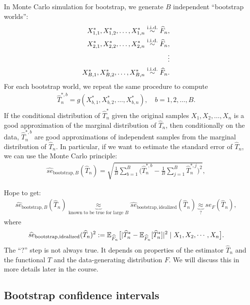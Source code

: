 \documentclass[11pt,letterpaper]{article}
\numberwithin{assumption}{lecture}
\numberwithin{theorem}{lecture}
\numberwithin{proposition}{lecture}
\numberwithin{lemma}{lecture}
\numberwithin{claim}{lecture}
\numberwithin{corollary}{lecture}
\numberwithin{definition}{lecture}
\numberwithin{conjecture}{lecture}
\numberwithin{remark}{lecture}
\numberwithin{example}{lecture}
\numberwithin{equation}{lecture}
\begin{document}
\begin{itemize}
  In Monte Carlo simulation for bootstrap, we generate $B$ independent ``bootstrap worlds'':
  \begin{align*}
    X_{1, 1}^*, X_{1, 2}^*, \ldots, X_{1, n}^* \overset{\mathrm{i.i.d.}}{\sim} \widehat{F}_n,\\
    X_{2, 1}^*, X_{2, 2}^*, \ldots, X_{2, n}^* \overset{\mathrm{i.i.d.}}{\sim} \widehat{F}_n,\\
    \vdots\\
    X_{B, 1}^*, X_{B, 2}^*, \ldots, X_{B, n}^* \overset{\mathrm{i.i.d.}}{\sim} \widehat{F}_n.
  \end{align*}
  For each bootstrap world, we repeat the same procedure to compute
  \begin{align*}
    \widehat{T}_{n}^{*, b} = g (X_{b, 1}^*, X_{b, 2}^*, \ldots, X_{b, n}^*), \quad b = 1, 2, \ldots, B.
  \end{align*}
  If the conditional distribution of $\widehat{T}_n^*$ given the original samples $X_1, X_2, \ldots, X_n$ is a good approximation of the marginal distribution of $\widehat{T}_n$, then conditionally on the data, $ \widehat{T}_{n}^{*, b} $ are good approximations of independent samples from the marginal distribution of $\widehat{T}_n$. In particular, if we want to estimate the standard error of $\widehat{T}_n$, we can use the Monte Carlo principle:
  \begin{align*}
    \widehat{se}_{\mathrm{bootstrap}, B} (\widehat{T}_n) = \sqrt{\frac{1}{B} \sum_{b=1}^B \big(\widehat{T}_{n}^{*, b} -  \frac{1}{B} \sum_{j=1}^B \widehat{T}_{n}^{*, j}\big)^2},
  \end{align*}
\end{itemize}
Hope to get:
\begin{align*}
  \widehat{se}_{\mathrm{bootstrap}, B} (\widehat{T}_n) \underbrace{\approx}_{\mbox{known to be true for large }B} \widehat{se}_{\mathrm{bootstrap, idealized}} (\widehat{T}_n) \underbrace{\approx}_{?} {se}_F (\widehat{T}_n),
\end{align*}
where
\begin{align*}
  \widehat{se}_{\mathrm{bootstrap, idealized}} (\widehat{T}_n)^2 := {\mathbb{E}}_{\widehat{F}_n} \big[ | \widehat{T}_n^* - {\mathbb{E}}_{\widehat{F}_n} [\widehat{T}_n^*] |^2 \mid X_1, X_2, \cdots, X_n \big].
\end{align*}
The ``?'' step is not always true. It depends on properties of the estimator $\widehat{T}_n$ and the functional $T$ and the data-generating distribution $F$. We will discuss this in more details later in the course.


\subsection{Bootstrap confidence intervals}
\end{document}
